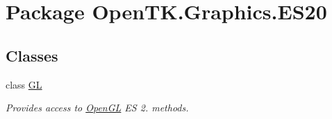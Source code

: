 \hypertarget{namespace_open_t_k_1_1_graphics_1_1_e_s20}{\section{Package Open\-T\-K.\-Graphics.\-E\-S20}
\label{namespace_open_t_k_1_1_graphics_1_1_e_s20}
}
\subsection*{Classes}
\begin{DoxyCompactItemize}
\item 
class \hyperlink{class_open_t_k_1_1_graphics_1_1_e_s20_1_1_g_l}{G\-L}
\begin{DoxyCompactList}\small\item\em Provides access to \hyperlink{namespace_open_t_k_1_1_graphics_1_1_open_g_l}{Open\-G\-L} E\-S 2. methods. \end{DoxyCompactList}\end{DoxyCompactItemize}
